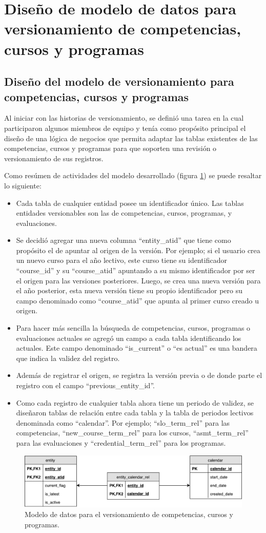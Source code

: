 \section{Diseño de modelo de datos para versionamiento de competencias, cursos y programas}
\subsection{Diseño del modelo de versionamiento para competencias, cursos y programas}
Al iniciar con las historias de versionamiento, se definió una tarea en la cual participaron algunos miembros de equipo y tenía como propósito principal el diseño de una lógica de negocios que permita adaptar las tablas existentes de las competencias, cursos y programas para que soporten una revisión o versionamiento de sus registros.

Como resúmen de actividades del modelo desarrollado (figura \ref{version_model}) se puede resaltar lo siguiente:
\begin{itemize}
	\item Cada tabla de cualquier entidad posee un identificador único. Las tablas entidades versionables son las de competencias, cursos, programas, y evaluaciones.
	\item Se decidió agregar una nueva columna \enquote{entity_atid} que tiene como propósito el de apuntar al origen de la versión. Por ejemplo; si el usuario crea un nuevo curso para el año lectivo, este curso tiene su identificador \enquote{course_id} y su \enquote{course_atid} apuntando a su mismo identificador por ser el origen para las versiones posteriores. Luego, se crea una nueva versión para el año posterior, esta nueva versión tiene su propio identificador pero su campo denominado como \enquote{course_atid} que apunta al primer curso creado u origen.
	\item Para hacer más sencilla la búsqueda de competencias, cursos, programas o evaluaciones actuales se agregó un campo a cada tabla identificando los actuales. Este campo denominado \enquote{is_current} o “es actual” es una bandera que indica la validez del registro.
	\item Además de registrar el origen, se registra la versión previa o de donde parte el registro con el campo \enquote{previous_entity_id}.
	\item Como cada registro de cualquier tabla ahora tiene un periodo de validez, se diseñaron tablas de relación entre cada tabla y la tabla de periodos lectivos denominada como \enquote{calendar}. Por ejemplo; \enquote{slo_term_rel} para las competencias, \enquote{new_course_term_rel} para los cursos, \enquote{asmt_term_rel} para las evaluaciones y \enquote{credential_term_rel} para los programas.
\end{itemize}

\begin{figure}
\centering
\includegraphics[width=125mm,scale=1]{Capitulos/DesarrollodelaAplicacion/Imagenes/version_model}
\caption{Modelo de datos para el versionamiento de competencias, cursos y programas.}
  \label{version_model}
\end{figure}